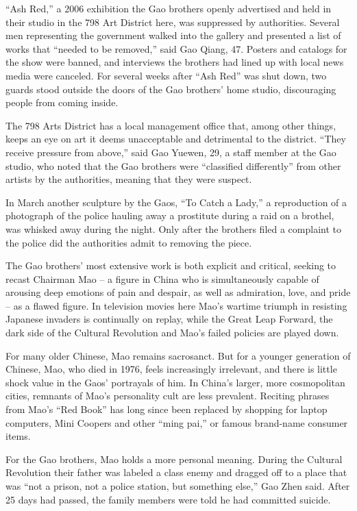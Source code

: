 ﻿\documentclass[12pt]{article}
\begin{document}
``Ash Red,'' a 2006 exhibition the Gao brothers openly advertised and held in their studio in the
798 Art District here, was suppressed by authorities. Several men representing the government walked
into the gallery and presented a list of works that ``needed to be removed,'' said Gao Qiang, 47.
Posters and catalogs for the show were banned, and interviews the brothers had lined up with local
news media were canceled. For several weeks after ``Ash Red'' was shut down, two guards stood
outside the doors of the Gao brothers' home studio, discouraging people from coming inside.

The 798 Arts District has a local management office that, among other things, keeps an eye on art it
deems unacceptable and detrimental to the district. ``They receive pressure from above,'' said Gao
Yuewen, 29, a staff member at the Gao studio, who noted that the Gao brothers were ``classified
differently'' from other artists by the authorities, meaning that they were suspect.

In March another sculpture by the Gaos, ``To Catch a Lady,'' a reproduction of a photograph of the
police hauling away a prostitute during a raid on a brothel, was whisked away during the night. Only
after the brothers filed a complaint to the police did the authorities admit to removing the piece.

The Gao brothers' most extensive work is both explicit and critical, seeking to recast Chairman Mao
-- a figure in China who is simultaneously capable of arousing deep emotions of pain and despair, as
well as admiration, love, and pride -- as a flawed figure. In television movies here Mao's wartime
triumph in resisting Japanese invaders is continually on replay, while the Great Leap Forward, the
dark side of the Cultural Revolution and Mao's failed policies are played down.

For many older Chinese, Mao remains sacrosanct\cite{sacrosanct}. But for a younger generation of
Chinese, Mao, who died in 1976, feels increasingly irrelevant, and there is little shock value in
the Gaos' portrayals of him. In China's larger, more cosmopolitan cities, remnants of Mao's
personality cult are less prevalent\cite{prevalent}. Reciting phrases from Mao's ``Red Book'' has
long since been replaced by shopping for laptop computers, Mini Coopers and other ``ming pai,'' or
famous brand-name consumer items.

For the Gao brothers, Mao holds a more personal meaning. During the Cultural Revolution their father
was labeled a class enemy and dragged off to a place that was ``not a prison, not a police station,
but something else,'' Gao Zhen said. After 25 days had passed, the family members were told he had
committed suicide.
\end{document}
